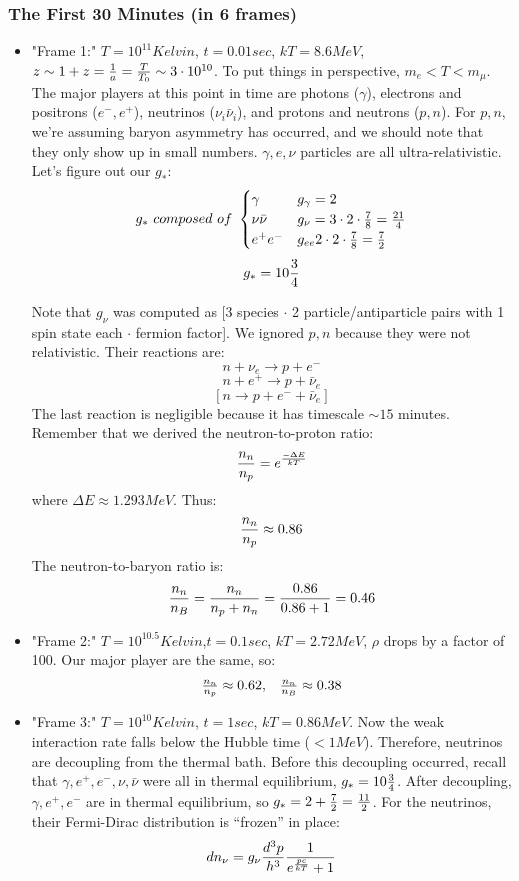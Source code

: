 \documentclass{article}
\def\inv#1{\frac{1}{ #1}}
\begin{document}
\subsubsection*{ The First 30 Minutes (in 6 frames)}

\begin{itemize}
\item"Frame 1:" $T=10^{11}Kelvin$, $t=0.01sec$, $kT=8.6MeV$, 
$z\sim 1+z=\inv{a}={T\over T_0}\sim 3\cdot 10^{10}$.  
To put things in perspective, $m_e<T<m_\mu$.  The major players at this point
in time are photons ($\gamma$), electrons and positrons ($e^-,e^+$), neutrinos 
($\nu_i\bar \nu_i$), and protons and neutrons ($p, n$). For $p, n$, we're assuming 
baryon asymmetry has occurred, and we should note that they only show up in 
small numbers.  $\gamma,e,\nu$ particles are all ultra-relativistic.  
Let's figure out our $g_*$:
$$g_*\ composed\ of\ \begin{cases}\gamma &g_\gamma=2\\
\nu\bar \nu &g_\nu=3\cdot2\cdot{7\over8}={21\over4}\\
e^+e^- &g_{ee}2\cdot2\cdot{7\over8}={7\over2}\\\end{cases}$$
$$g_* = 10{3\over4}$$

Note that $g_\nu$ was computed as [3 species $\cdot$ 2 particle/antiparticle 
pairs with 1 spin state each $\cdot$ fermion factor].  We ignored $p, n$ 
because they were not relativistic.  Their reactions are:
$$n+\nu_e\to p+e^-$$
$$n+e^+\to p+\bar \nu_e$$
$$[n\to p+e^-+\bar \nu_e]$$
The last reaction is negligible because it has timescale $\sim15$ minutes.
Remember that we derived the neutron-to-proton ratio:
$${n_n\over n_p}=e^{-\Delta E\over kT}$$
where $\Delta E\approx1.293MeV$.  Thus:
$${n_n\over n_p}\approx 0.86$$
The neutron-to-baryon ratio is:
$${n_n\over n_B}={n_n\over n_p+n_n}={0.86\over0.86+1}=0.46$$

\item"Frame 2:" $T=10^{10.5}Kelvin$,$t=0.1sec$, $kT=2.72MeV$, $\rho$ drops by
a factor of 100.  Our major player are the same, so:
$$\begin{matrix} {n_n\over n_p}\approx 0.62,&{n_n\over n_B}\approx 0.38 \end{matrix}$$

\item"Frame 3:" $T=10^{10} Kelvin$, $t=1sec$, $kT=0.86MeV$.  Now the weak
interaction rate falls below the Hubble time ($<1MeV$). Therefore, neutrinos 
are decoupling from the thermal bath.  Before this decoupling occurred, 
recall that
$\gamma, e^+,e^-,\nu,\bar \nu$ were all in thermal equilibrium, $g_*=10{3\over4}$.
After decoupling, $\gamma,e^+,e^-$ are in thermal equilibrium, 
so $g_*=2+{7\over2}={11\over2}$.
For the neutrinos, their Fermi-Dirac distribution is ``frozen'' in place:
$$dn_\nu=g_\nu{d^3p\over h^3}{1\over e^{pc\over kT}+1}$$


\end{itemize}
\end{document}
